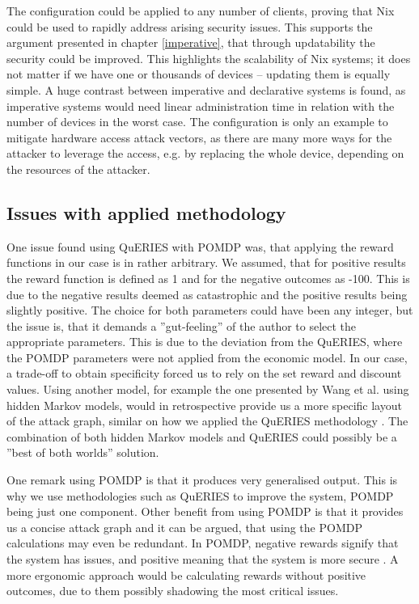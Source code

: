 The configuration could be applied to any number of clients, proving
that Nix could be used to rapidly address arising security
issues. This supports the argument presented in chapter
\ref{imperative}, that through updatability the security could be
improved. This highlights the scalability of Nix systems; it does not
matter if we have one or thousands of devices – updating them is
equally simple. A huge contrast between imperative and declarative
systems is found, as imperative systems would need linear
administration time in relation with the number of devices in the worst case. The
configuration is only an example to mitigate hardware access attack
vectors, as there are many more ways for the attacker to leverage the
access, e.g. by replacing the whole device, depending on the resources
of the attacker.

\subsection{Issues with applied methodology} \label{issues}

One issue found using QuERIES with POMDP was, that applying the reward
functions in our case is in rather arbitrary. We assumed, that for
positive results the reward function is defined as 1 and for the
negative outcomes as -100. This is due to the negative results deemed
as catastrophic and the positive results being slightly positive. The
choice for both parameters could have been any integer, but the issue
is, that it demands a ''gut-feeling'' of the author to select the
appropriate parameters. This is due to the deviation from the QuERIES,
where the POMDP parameters were not applied from the economic model. In our case, a trade-off to obtain
specificity forced us to rely on the set reward and discount
values. Using another model, for example the one presented by Wang
et al. using hidden Markov models, would in retrospective provide us a
more specific layout of the attack graph, similar on how we applied
the QuERIES methodology \cite{wang2010framework}. The
combination of both hidden Markov models and QuERIES could possibly be a ''best
of both worlds'' solution.

One remark using POMDP is that it produces very generalised
output. This is why we use methodologies such as QuERIES to improve
the system, POMDP being just one component. Other benefit from using
POMDP is that it provides us a concise attack graph and it can be argued, that
using the POMDP calculations may even be redundant. In POMDP, negative
rewards signify that the system has issues, and positive meaning that
the system is more secure \cite{mcabeeMarkov}. A more ergonomic approach
would be calculating rewards without positive outcomes, due to them
possibly shadowing the most critical issues.


